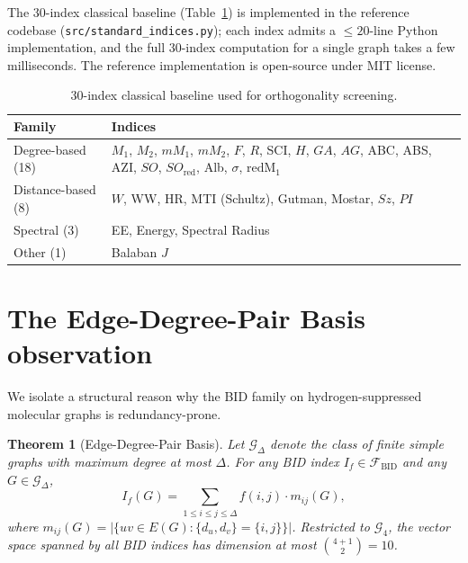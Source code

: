 \documentclass[11pt,a4paper]{article}
\newtheorem{theorem}{Theorem}[section]
\theoremstyle{definition}
\newcommand{\bid}{\mathcal{F}_{\mathrm{BID}}}
\begin{document}
The $30$-index classical baseline (Table~\ref{tab:baseline}) is
implemented in the reference codebase
(\texttt{src/standard\_indices.py}); each index admits a $\le 20$-line
Python implementation, and the full $30$-index computation for a
single graph takes a few milliseconds. The reference
implementation is open-source under MIT license.

\begin{table}[h]
\centering
\caption{$30$-index classical baseline used for orthogonality screening.}
\label{tab:baseline}
\small
\begin{tabular}{ll}
\toprule
Family & Indices\\
\midrule
Degree-based (18) & $M_1$, $M_2$, $mM_1$, $mM_2$, $F$, $R$, SCI, $H$, $GA$, $AG$, ABC, ABS, AZI, $SO$, $SO_{\mathrm{red}}$, Alb, $\sigma$, $\mathrm{redM}_1$\\
Distance-based (8) & $W$, WW, HR, MTI (Schultz), Gutman, Mostar, $Sz$, $PI$\\
Spectral (3) & EE, Energy, Spectral Radius\\
Other (1) & Balaban $J$\\
\bottomrule
\end{tabular}
\end{table}

\section{The Edge-Degree-Pair Basis observation}\label{sec:bid}

We isolate a structural reason why the BID family on
hydrogen-suppressed molecular graphs is redundancy-prone.

\begin{theorem}[Edge-Degree-Pair Basis]\label{thm:bid}
Let $\mathcal{G}_\Delta$ denote the class of finite simple graphs
with maximum degree at most $\Delta$. For any BID index
$I_f\in\bid$ and any $G\in\mathcal{G}_\Delta$,
\begin{equation}\label{eq:bid_linear}
I_f(G)=\sum_{1\le i\le j\le\Delta} f(i,j)\cdot m_{ij}(G),
\end{equation}
where $m_{ij}(G)=\bigl|\{uv\in E(G):\{d_u,d_v\}=\{i,j\}\}\bigr|$.
Restricted to $\mathcal{G}_4$, the vector space spanned by all BID
indices has dimension at most $\binom{4+1}{2}=10$.
\end{theorem}
\end{document}
